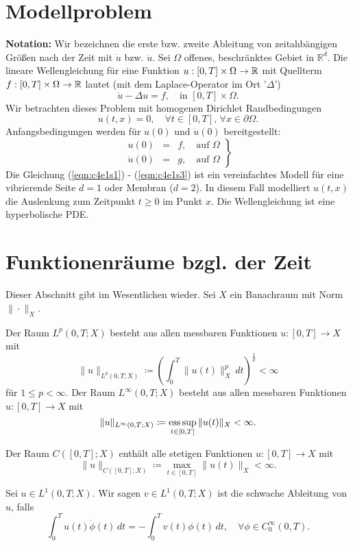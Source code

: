\documentclass[../skript.tex]{subfiles}
\begin{document}
\section{Modellproblem}\label{sec:c4e1}
\textbf{Notation:} Wir bezeichnen die erste bzw. zweite Ableitung von zeitahbängigen Größen nach der Zeit mit $\dot{u}$ bzw. $\ddot{u}$. Sei $\Omega$ offenes, beschränktes Gebiet in $\mathbb{R}^d$. Die lineare Wellengleichung für eine Funktion $u:[0,T]\times\Omega\to\mathbb{R}$ mit Quellterm $f:[0,T]\times\Omega\to\mathbb{R}$ lautet (mit dem Laplace-Operator im Ort '$\Delta$')
\begin{equation}\label{eqn:c4e1s1}
	\ddot{u}-\Delta u = f,\quad\text{in }[0,T]\times\Omega.
\end{equation}
Wir betrachten dieses Problem mit homogenen Dirichlet Randbedingungen
\begin{equation}\label{eqn:c4e1s2}
	u(t,x) = 0,\quad\forall t\in[0,T],\,\forall x\in\partial\Omega.
\end{equation}
Anfangsbedingungen werden für $u(0)$ und $\dot{u}(0)$ bereitgestellt:
\begin{equation}\label{eqn:c4e1s3}
	\left.
	\begin{aligned}
		u(0) &=& f,\quad\text{auf }\Omega\\
		\dot{u}(0) &=& g,\quad\text{auf }\Omega
	\end{aligned}
	\right\}
\end{equation}
Die Gleichung (\ref {eqn:c4e1s1}) - (\ref {eqn:c4e1s3}) ist ein vereinfachtes Modell für eine vibrierende Seite $d=1$ oder Membran ($d=2$). In diesem Fall modelliert $u(t,x)$ die Auslenkung zum Zeitpunkt $t\geq 0$ im Punkt $x$. Die Wellengleichung ist eine hyperbolische PDE.

\section{Funktionenräume bzgl. der Zeit} 
Dieser Abschnitt gibt im Wesentlichen \cite[Sec. 5.9.2]{Evans} wieder. Sei $X$ ein Banachraum mit Norm $\|\cdot\|_X$.
\begin{definition}\label{def:c4e2s1}
	Der Raum $L^p(0,T;X)$ besteht aus allen messbaren Funktionen $u:[0,T]\to X$ mit
	\[
		\|u\|_{L^p(0,T;X)} \coloneqq \left( \int_0^T \|u(t)\|_X^p\,dt \right)^{\frac{1}{p}} < \infty
	\]
	für $1\leq p < \infty$.\newline\noindent
	Der Raum $L^\infty(0,T;X)$ besteht aus allen messbaren Funktionen $u:[0,T]\to X$ mit 
	\[
		\|u\|_{L^\infty(0,T;X)} \coloneqq \operatorname*{ess\,sup}_{t\in[0,T]} \|u(t)\|_X < \infty.
	\]
\end{definition}

\begin{definition}\label{def:c4e2s2}
	Der Raum $C([0,T];X)$ enthält alle stetigen Funktionen $u:[0,T]\to X$ mit 
	\[
		\|u\|_{C([0,T];X)} \coloneqq \max_{t\in[0,T]} \|u(t)\|_X < \infty.
	\]
\end{definition}

\begin{definition}\label{def:c4e2s3}
	Sei $u\in L^1(0,T;X)$. Wir sagen $v\in L^1(0,T;X)$ ist die schwache Ableitung von $u$, falls
	\[
		\int_0^T u(t)\dot{\phi}(t)\,dt = - \int_0^T v(t)\phi(t)\,dt,\quad\forall\phi\in C^\infty_0(0,T).
	\]
\end{definition}
\end{document}

